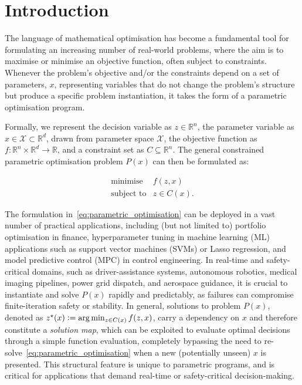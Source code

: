 \section{Introduction}
The language of mathematical optimisation has become a fundamental tool for formulating an increasing number of real-world problems, where the aim is to maximise or minimise an objective function, often subject to constraints. Whenever the problem's objective and/or the constraints depend on a set of parameters, $x$, representing variables that do not change the problem's structure but produce a specific problem instantiation, it takes the form of a parametric optimisation program. 

Formally, we represent the decision variable as $z \in \mathbb{R}^n$, the parameter variable as $x \in \mathcal{X} \subset \mathbb{R}^d$, drawn from parameter space $\mathcal{X}$, the objective function as $f : \mathbb{R}^n\times\mathbb{R}^d \rightarrow \mathbb{R}$, and a constraint set as $C \subseteq \mathbb{R}^n$. The general constrained parametric optimisation problem $P(x)$ can then be formulated as:

\begin{equation} \label{eq:parametric_optimisation}
\begin{array}{ll}
    \text{minimise}  & f(z,x) \\
    \text{subject to} & z \in C(x).
\end{array}
\end{equation}

The formulation in~\eqref{eq:parametric_optimisation} can be deployed in a vast number of practical applications, including (but not limited to) portfolio optimisation in finance, hyperparameter tuning in machine learning (ML) applications such as support vector machines (SVMs) or Lasso regression, and model predictive control (MPC) in control engineering. In real-time and safety-critical domains, such as driver-assistance systems, autonomous robotics, medical imaging pipelines, power grid dispatch, and aerospace guidance, it is crucial to instantiate and solve $P(x)$ rapidly and predictably, as failures can compromise finite-iteration safety or stability. In general, solutions to problem $P(x)$, denoted as $z^\star(x) \vcentcolon= \arg\min_{z \in C(x)} f(z,x)$, carry a dependency on $x$ and therefore constitute a \textit{solution map}, which can be exploited to evaluate optimal decisions through a simple function evaluation, completely bypassing the need to re-solve~\eqref{eq:parametric_optimisation} when a new (potentially unseen) $x$ is presented. This structural feature is unique to parametric programs, and is critical for applications that demand real-time or safety-critical decision-making.

